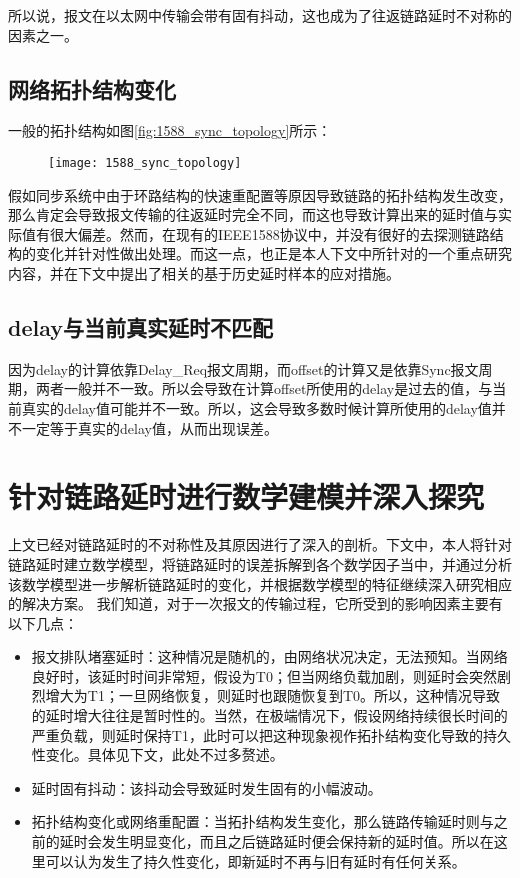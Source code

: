 所以说，报文在以太网中传输会带有固有抖动，这也成为了往返链路延时不对称的因素之一。

\subsection{网络拓扑结构变化}
一般的拓扑结构如图\ref{fig:1588_sync_topology}所示：

\begin{figure}[!hbp]
  \centering
  \begin{minipage}[b]{0.6\textwidth}
    \captionstyle{\centering}
    \centering
    \texttt{[image: 1588\_sync\_topology]}
  \end{minipage}     
\end{figure}

假如同步系统中由于环路结构的快速重配置等原因导致链路的拓扑结构发生改变，那么肯定会导致报文传输的往返延时完全不同，而这也导致计算出来的延时值与实际值有很大偏差。然而，在现有的IEEE1588协议中，并没有很好的去探测链路结构的变化并针对性做出处理。而这一点，也正是本人下文中所针对的一个重点研究内容，并在下文中提出了相关的基于历史延时样本的应对措施。

\subsection{delay与当前真实延时不匹配}
因为delay的计算依靠Delay\_Req报文周期，而offset的计算又是依靠Sync报文周期，两者一般并不一致。所以会导致在计算offset所使用的delay是过去的值，与当前真实的delay值可能并不一致。所以，这会导致多数时候计算所使用的delay值并不一定等于真实的delay值，从而出现误差。

\section{针对链路延时进行数学建模并深入探究}
上文已经对链路延时的不对称性及其原因进行了深入的剖析。下文中，本人将针对链路延时建立数学模型，将链路延时的误差拆解到各个数学因子当中，并通过分析该数学模型进一步解析链路延时的变化，并根据数学模型的特征继续深入研究相应的解决方案。
我们知道，对于一次报文的传输过程，它所受到的影响因素主要有以下几点：
\begin{itemize}[noitemsep,topsep=0pt,parsep=0pt,partopsep=0pt]
	\item 报文排队堵塞延时：这种情况是随机的，由网络状况决定，无法预知。当网络良好时，该延时时间非常短，假设为T0；但当网络负载加剧，则延时会突然剧烈增大为T1；一旦网络恢复，则延时也跟随恢复到T0。所以，这种情况导致的延时增大往往是暂时性的。当然，在极端情况下，假设网络持续很长时间的严重负载，则延时保持T1，此时可以把这种现象视作拓扑结构变化导致的持久性变化。具体见下文，此处不过多赘述。
	\item 延时固有抖动：该抖动会导致延时发生固有的小幅波动。
	\item 拓扑结构变化或网络重配置：当拓扑结构发生变化，那么链路传输延时则与之前的延时会发生明显变化，而且之后链路延时便会保持新的延时值。所以在这里可以认为发生了持久性变化，即新延时不再与旧有延时有任何关系。
\end{itemize}


